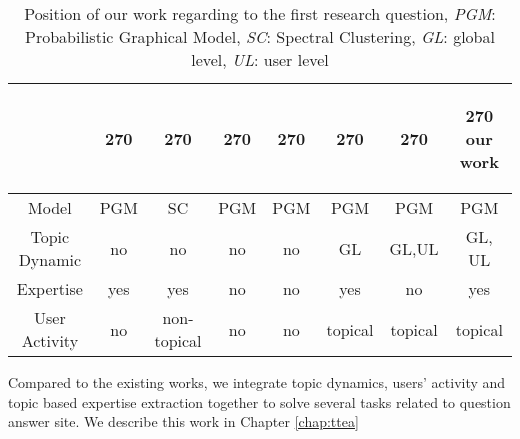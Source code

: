     
        \begin{table}[htp]
        \centering
        \begin{tabular}{c c c c c c c c}
        &
        \begin{turn}{270}
            \cite{yang2013cqarank} 
        \end{turn} 
         &
        \begin{turn}{270}
            \cite{Chang:2013}  %
        \end{turn} 
        &
        \begin{turn}{270} 
            \cite{guo2008tapping} %
        \end{turn}
        &
        \begin{turn}{270} 
            \cite{blei2003latent} %
        \end{turn}
        &
        \begin{turn}{270}
            \cite{hu2014user} %
        \end{turn}
        &
        \begin{turn}{270}
            \cite{chp7diao2012finding} %
        \end{turn}
        &
        \begin{turn}{270}
        our work
        \end{turn}
        \\ \hline
        Model & PGM &SC & PGM & PGM & PGM & PGM& PGM\\ \hline
        Topic Dynamic & no & no & no & no & GL & GL,UL & GL, UL \\ \hline
        Expertise & yes & yes& no & no & yes &no &yes   \\ \hline
        User Activity& no & non-topical & no & no &topical & topical & topical \\ \hline
        \end{tabular}
        \caption{Position of our work regarding to the first research question, \textit{PGM}: Probabilistic Graphical Model, \textit{SC}: Spectral Clustering, \textit{GL}: global level, \textit{UL}: user level}
        \label{tab:rq5compare}
    \end{table}
    Compared to the existing works, we integrate topic dynamics, users' activity and topic based expertise extraction together to solve several tasks related to question answer site. We describe this work in Chapter \ref{chap:ttea}

    












